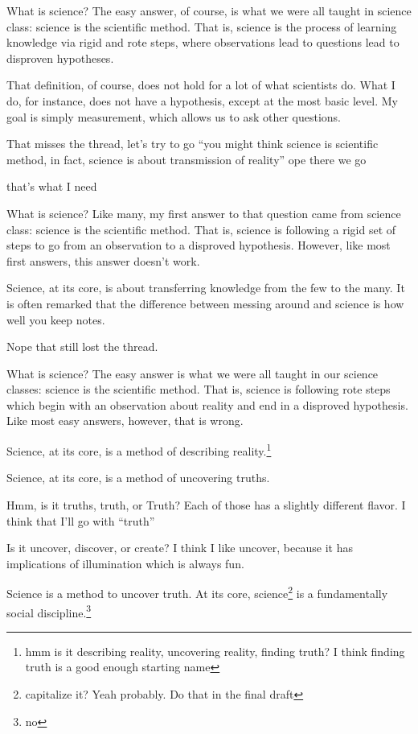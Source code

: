 \documentclass[12pt]{article}[titlepage]
\newcommand{\say}[1]{``#1''}
\renewcommand{\,}{\textsuperscript{,}}
\begin{document}
What is science?
The easy answer, of course, is what we were all taught in science class: science is the scientific method.
That is, science is the process of learning knowledge via rigid and rote steps, where observations lead to questions lead to disproven hypotheses.

That definition, of course, does not hold for a lot of what scientists do.
What I do, for instance, does not have a hypothesis, except at the most basic level.
My goal is simply measurement, which allows us to ask other questions.

That misses the thread, let's try to go \say{you might think science is scientific method, in fact, science is about transmission of reality}
ope there we go

that's what I need

What is science?
Like many, my first answer to that question came from science class: science is the scientific method.
That is, science is following a rigid set of steps to go from an observation to a disproved hypothesis.
However, like most first answers, this answer doesn't work.

Science, at its core, is about transferring knowledge from the few to the many.
It is often remarked that the difference between messing around and science is how well you keep notes.

Nope that still lost the thread.

What is science?
The easy answer is what we were all taught in our science classes: science is the scientific method.
That is, science is following rote steps which begin with an observation about reality and end in a disproved hypothesis.
Like most easy answers, however, that is wrong.

Science, at its core, is a method of describing reality.\footnote{hmm is it describing reality, uncovering reality, finding truth? I think finding truth is a good enough starting name}

Science, at its core, is a method of uncovering truths.

Hmm, is it truths, truth, or Truth?
Each of those has a slightly different flavor.
I think that I'll go with \say{truth}

Is it uncover, discover, or create?
I think I like uncover, because it has implications of illumination which is always fun.

Science is a method to uncover truth.
At its core, science\footnote{capitalize it? Yeah probably. Do that in the final draft} is a fundamentally social discipline.\footnote{no}
\end{document}
